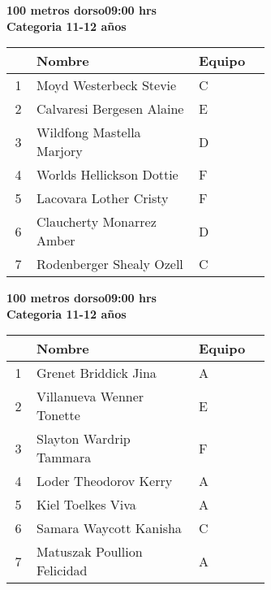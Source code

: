 \begin{minipage}{0.95\linewidth}\vspace{0.5cm} 
\begin{flushleft}
\textbf{
\hspace{-0.15cm}100 metros dorso\hspace{1.5cm}09:00 hrs \\Categoria 11-12 años}\vspace{-0.2cm} 
\end{flushleft}
\begin{tabular}{cp{0.63\linewidth}l}
\hline
& \textbf{Nombre} & \textbf{Equipo} \\ \hline
1 & Moyd Westerbeck Stevie & C \\ 
2 & Calvaresi Bergesen Alaine & E \\ 
3 & Wildfong Mastella Marjory & D \\ 
4 & Worlds Hellickson Dottie & F \\ 
5 & Lacovara Lother Cristy & F \\ 
6 & Claucherty Monarrez Amber & D \\ 
7 & Rodenberger Shealy Ozell & C \\ 
\end{tabular}
\end{minipage}
\begin{minipage}{0.95\linewidth}\vspace{0.5cm} 
\begin{flushleft}
\textbf{
\hspace{-0.15cm}100 metros dorso\hspace{1.5cm}09:00 hrs \\Categoria 11-12 años}\vspace{-0.2cm} 
\end{flushleft}
\begin{tabular}{cp{0.63\linewidth}l}
\hline
& \textbf{Nombre} & \textbf{Equipo} \\ \hline
1 & Grenet Briddick Jina & A \\ 
2 & Villanueva Wenner Tonette & E \\ 
3 & Slayton Wardrip Tammara & F \\ 
4 & Loder Theodorov Kerry & A \\ 
5 & Kiel Toelkes Viva & A \\ 
6 & Samara Waycott Kanisha & C \\ 
7 & Matuszak Poullion Felicidad & A \\ 
\end{tabular}
\end{minipage}
